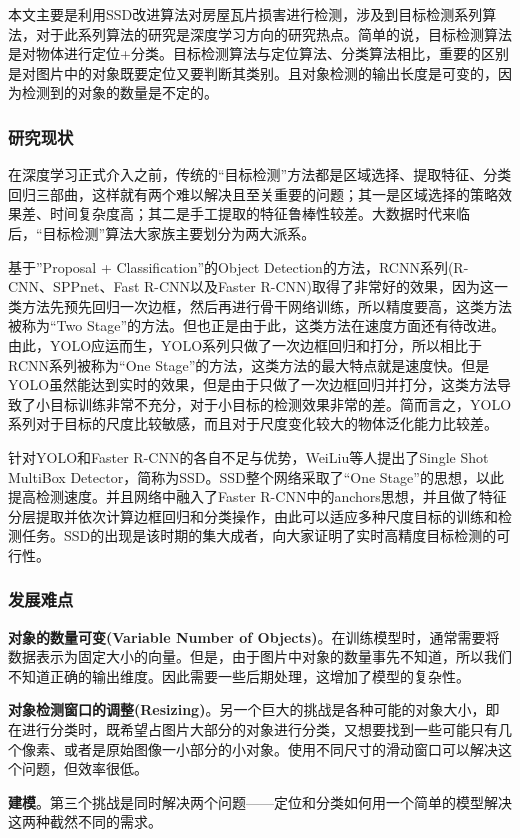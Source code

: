 本文主要是利用SSD改进算法对房屋瓦片损害进行检测，涉及到目标检测系列算法，对于此系列算法的研究是深度学习方向的研究热点。简单的说，目标检测算法是对物体进行定位+分类。目标检测算法与定位算法、分类算法相比，重要的区别是对图片中的对象既要定位又要判断其类别。且对象检测的输出长度是可变的，因为检测到的对象的数量是不定的。

\subsubsection{研究现状}
在深度学习正式介入之前，传统的“目标检测”方法都是区域选择、提取特征、分类回归三部曲\cite{hkq}，这样就有两个难以解决且至关重要的问题；其一是区域选择的策略效果差、时间复杂度高；其二是手工提取的特征鲁棒性较差。大数据时代来临后，“目标检测”算法大家族主要划分为两大派系。

基于”Proposal + Classification”的Object Detection的方法，RCNN系列(R-CNN\cite{rcnn}、SPPnet\cite{sppnet}、Fast R-CNN\cite{fastrcnn}以及Faster R-CNN\cite{fasterrcnn})取得了非常好的效果，因为这一类方法先预先回归一次边框，然后再进行骨干网络训练，所以精度要高，这类方法被称为“Two Stage”的方法。但也正是由于此，这类方法在速度方面还有待改进。由此，YOLO\cite{yolo}应运而生，YOLO系列只做了一次边框回归和打分，所以相比于RCNN系列被称为“One Stage”的方法，这类方法的最大特点就是速度快。但是YOLO虽然能达到实时的效果，但是由于只做了一次边框回归并打分，这类方法导致了小目标训练非常不充分，对于小目标的检测效果非常的差。简而言之，YOLO系列对于目标的尺度比较敏感，而且对于尺度变化较大的物体泛化能力比较差。

针对YOLO和Faster R-CNN的各自不足与优势，WeiLiu等人提出了Single Shot MultiBox Detector，简称为SSD。SSD整个网络采取了“One Stage”的思想，以此提高检测速度。并且网络中融入了Faster R-CNN\cite{fasterrcnn}中的anchors思想，并且做了特征分层提取并依次计算边框回归和分类操作，由此可以适应多种尺度目标的训练和检测任务。SSD的出现是该时期的集大成者，向大家证明了实时高精度目标检测的可行性。

\subsubsection{发展难点}
\textbf{对象的数量可变(Variable Number of Objects)}。在训练模型时，通常需要将数据表示为固定大小的向量。但是，由于图片中对象的数量事先不知道，所以我们不知道正确的输出维度。因此需要一些后期处理，这增加了模型的复杂性。

\textbf{对象检测窗口的调整(Resizing)}。另一个巨大的挑战是各种可能的对象大小，即在进行分类时，既希望占图片大部分的对象进行分类，又想要找到一些可能只有几个像素、或者是原始图像一小部分的小对象。使用不同尺寸的滑动窗口可以解决这个问题，但效率很低。

\textbf{建模}。第三个挑战是同时解决两个问题——定位和分类如何用一个简单的模型解决这两种截然不同的需求。
